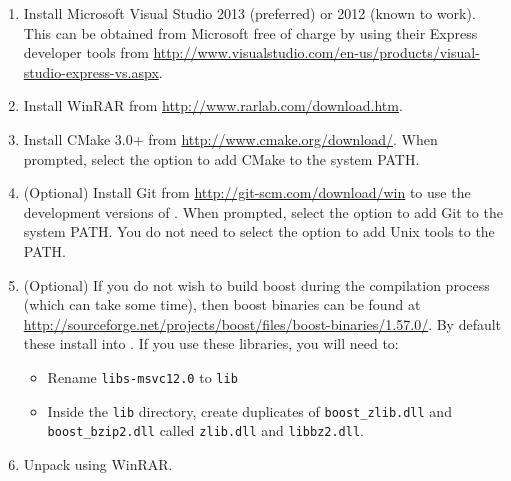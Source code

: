 \begin{enumerate}
  \item Install Microsoft Visual Studio 2013 (preferred) or 2012 (known to
  work). This can be obtained from Microsoft free of charge by using their
  Express developer tools from
  \url{http://www.visualstudio.com/en-us/products/visual-studio-express-vs.aspx}.
  \item Install WinRAR from \url{http://www.rarlab.com/download.htm}.
  \item Install CMake 3.0+ from \url{http://www.cmake.org/download/}. When
  prompted, select the option to add CMake to the system PATH.
  \item (Optional) Install Git from \url{http://git-scm.com/download/win} to use
  the development versions of \nekpp. When prompted, select the option to add
  Git to the system PATH. You do not need to select the option to add Unix tools
  to the PATH.
  \item (Optional) If you do not wish to build boost during the compilation
  process (which can take some time), then boost binaries can be found at
  \url{http://sourceforge.net/projects/boost/files/boost-binaries/1.57.0/}. By
  default these install into . If you use these libraries, you will need to:
  \begin{itemize}
    \item Rename \texttt{libs-msvc12.0} to \texttt{lib}
    \item Inside the \texttt{lib} directory, create duplicates of
    \texttt{boost\_zlib.dll} and \texttt{boost\_bzip2.dll} called
    \texttt{zlib.dll} and \texttt{libbz2.dll}.
  \end{itemize}
  \item Unpack  using WinRAR.


\end{enumerate}
